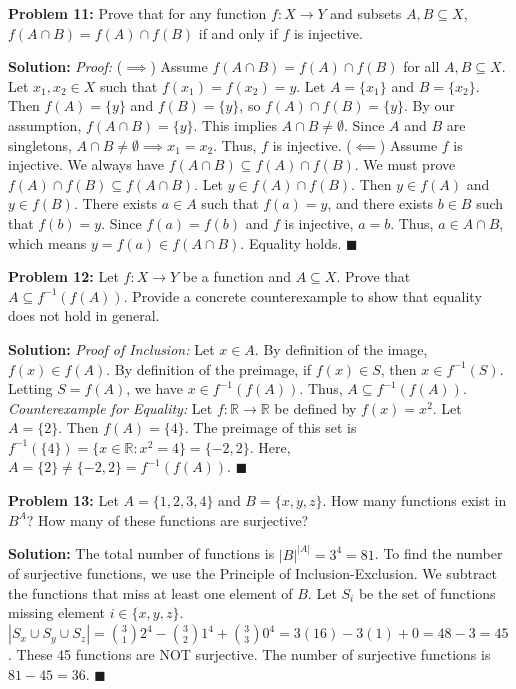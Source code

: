 \documentclass[11pt, letterpaper]{article}
\theoremstyle{definition}
\theoremstyle{remark}
\newcommand{\R}{\mathbb{R}}
\begin{document}
\vspace{1em}
\textbf{Problem 11:} Prove that for any function $f: X \to Y$ and subsets $A, B \subseteq X$, $f(A \cap B) = f(A) \cap f(B)$ if and only if $f$ is injective.

\textbf{Solution:}
\textit{Proof:}
($\implies$) Assume $f(A \cap B) = f(A) \cap f(B)$ for all $A, B \subseteq X$. Let $x_1, x_2 \in X$ such that $f(x_1) = f(x_2) = y$. Let $A = \{x_1\}$ and $B = \{x_2\}$. Then $f(A) = \{y\}$ and $f(B) = \{y\}$, so $f(A) \cap f(B) = \{y\}$. By our assumption, $f(A \cap B) = \{y\}$. This implies $A \cap B \neq \emptyset$. Since $A$ and $B$ are singletons, $A \cap B \neq \emptyset \implies x_1 = x_2$. Thus, $f$ is injective.
($\impliedby$) Assume $f$ is injective. We always have $f(A \cap B) \subseteq f(A) \cap f(B)$. We must prove $f(A) \cap f(B) \subseteq f(A \cap B)$. Let $y \in f(A) \cap f(B)$. Then $y \in f(A)$ and $y \in f(B)$. There exists $a \in A$ such that $f(a) = y$, and there exists $b \in B$ such that $f(b) = y$. Since $f(a) = f(b)$ and $f$ is injective, $a = b$. Thus, $a \in A \cap B$, which means $y = f(a) \in f(A \cap B)$. Equality holds. \hfill $\blacksquare$

\vspace{1em}
\textbf{Problem 12:} Let $f: X \to Y$ be a function and $A \subseteq X$. Prove that $A \subseteq f^{-1}(f(A))$. Provide a concrete counterexample to show that equality does not hold in general.

\textbf{Solution:}
\textit{Proof of Inclusion:} Let $x \in A$. By definition of the image, $f(x) \in f(A)$. By definition of the preimage, if $f(x) \in S$, then $x \in f^{-1}(S)$. Letting $S = f(A)$, we have $x \in f^{-1}(f(A))$. Thus, $A \subseteq f^{-1}(f(A))$.
\textit{Counterexample for Equality:} Let $f: \R \to \R$ be defined by $f(x) = x^2$. Let $A = \{2\}$. Then $f(A) = \{4\}$. The preimage of this set is $f^{-1}(\{4\}) = \{x \in \R : x^2 = 4\} = \{-2, 2\}$. Here, $A = \{2\} \neq \{-2, 2\} = f^{-1}(f(A))$. \hfill $\blacksquare$

\vspace{1em}
\textbf{Problem 13:} Let $A = \{1, 2, 3, 4\}$ and $B = \{x, y, z\}$. How many functions exist in $B^A$? How many of these functions are surjective?

\textbf{Solution:}
The total number of functions is $|B|^{|A|} = 3^4 = 81$.
To find the number of surjective functions, we use the Principle of Inclusion-Exclusion. We subtract the functions that miss at least one element of $B$.
Let $S_i$ be the set of functions missing element $i \in \{x, y, z\}$.
$|S_x \cup S_y \cup S_z| = \binom{3}{1}2^4 - \binom{3}{2}1^4 + \binom{3}{3}0^4 = 3(16) - 3(1) + 0 = 48 - 3 = 45$.
These 45 functions are NOT surjective. The number of surjective functions is $81 - 45 = 36$. \hfill $\blacksquare$
\end{document}
